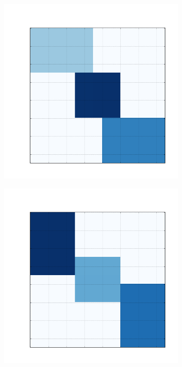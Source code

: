 \documentclass[
    12pt,                %
    oneside,            %
    a4paper,            %
    english,            %
    brazil                %
    ]{abntex2ppgsi}
\begin{document}
\begin{figure}[H]
\centering
    \caption{
        Resultado da reconstrução da base de dados (d) com $k = 5$ e (e) com $l = 5$, respectivamente, utilizando o algoritmo \textit{FNMTF}.
    }
    \begin{subfigure}[b]{0.18\textwidth}
        \includegraphics[width=\textwidth]{img/d-reconstruction-2-fnmtf.png}
    \end{subfigure}
    \begin{subfigure}[b]{0.18\textwidth}
        \includegraphics[width=\textwidth]{img/e-reconstruction-2-fnmtf.png}
    \end{subfigure}
\label{fig:reconstruction-2:fnmtf}
\end{figure}
\end{document}
